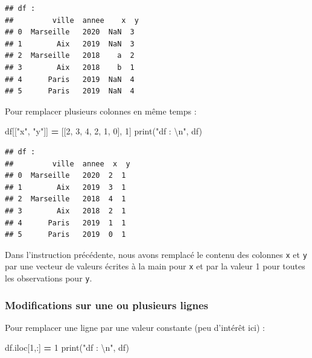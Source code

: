 \documentclass[12pt,]{book}
\newenvironment{Shaded}{\begin{snugshade}}{\end{snugshade}}
\newcommand{\DecValTok}[1]{\textcolor[rgb]{0.00,0.00,0.81}{#1}}
\newcommand{\CharTok}[1]{\textcolor[rgb]{0.31,0.60,0.02}{#1}}
\newcommand{\StringTok}[1]{\textcolor[rgb]{0.31,0.60,0.02}{#1}}
\newcommand{\OperatorTok}[1]{\textcolor[rgb]{0.81,0.36,0.00}{\textbf{#1}}}
\newcommand{\BuiltInTok}[1]{#1}
\newcommand{\NormalTok}[1]{#1}
\numberwithin{equation}{section}
\numberwithin{countremarque}{section}
\begin{document}
\begin{lstlisting}
## df : 
##         ville  annee    x  y
## 0  Marseille   2020  NaN  3
## 1        Aix   2019  NaN  3
## 2  Marseille   2018    a  2
## 3        Aix   2018    b  1
## 4      Paris   2019  NaN  4
## 5      Paris   2019  NaN  4
\end{lstlisting}

Pour remplacer plusieurs colonnes en même temps :

\begin{Shaded}
\begin{Highlighting}[]
\NormalTok{df[[}\StringTok{"x"}\NormalTok{, }\StringTok{"y"}\NormalTok{]] }\OperatorTok{=}\NormalTok{ [[}\DecValTok{2}\NormalTok{, }\DecValTok{3}\NormalTok{, }\DecValTok{4}\NormalTok{, }\DecValTok{2}\NormalTok{, }\DecValTok{1}\NormalTok{, }\DecValTok{0}\NormalTok{], }\DecValTok{1}\NormalTok{]}
\BuiltInTok{print}\NormalTok{(}\StringTok{"df : }\CharTok{\textbackslash{}n}\StringTok{"}\NormalTok{, df)}
\end{Highlighting}
\end{Shaded}

\begin{lstlisting}
## df : 
##         ville  annee  x  y
## 0  Marseille   2020  2  1
## 1        Aix   2019  3  1
## 2  Marseille   2018  4  1
## 3        Aix   2018  2  1
## 4      Paris   2019  1  1
## 5      Paris   2019  0  1
\end{lstlisting}

Dans l'instruction précédente, nous avons remplacé le contenu des
colonnes \texttt{x} et \texttt{y} par une vecteur de valeurs écrites à
la main pour \texttt{x} et par la valeur 1 pour toutes les observations
pour \texttt{y}.

\subsubsection{Modifications sur une ou plusieurs
lignes}\label{modifications-sur-une-ou-plusieurs-lignes}

Pour remplacer une ligne par une valeur constante (peu d'intérêt ici) :

\begin{Shaded}
\begin{Highlighting}[]
\NormalTok{df.iloc[}\DecValTok{1}\NormalTok{,:] }\OperatorTok{=} \DecValTok{1}
\BuiltInTok{print}\NormalTok{(}\StringTok{"df : }\CharTok{\textbackslash{}n}\StringTok{"}\NormalTok{, df)}
\end{Highlighting}
\end{Shaded}
\end{document}
